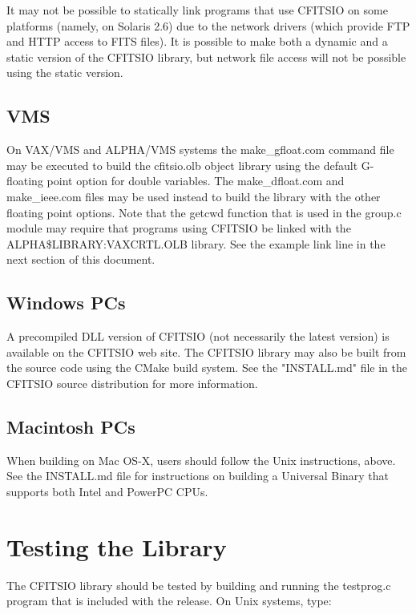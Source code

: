 \documentclass[11pt]{book}
\begin{document}
It may not be possible to statically link programs that use CFITSIO on
some platforms (namely, on Solaris 2.6) due to the network drivers
(which provide FTP and HTTP access to FITS files).  It is possible to
make both a dynamic and a static version of the CFITSIO library, but
network file access will not be possible using the static version.


\subsection{VMS}

On VAX/VMS and ALPHA/VMS systems the make\_gfloat.com command file may
be executed to build the cfitsio.olb object library using the default
G-floating point option for double variables.  The make\_dfloat.com and
make\_ieee.com files may be used instead to build the library with the
other floating point options. Note that the getcwd function that is
used in the group.c module may require that programs using CFITSIO be
linked with the ALPHA\$LIBRARY:VAXCRTL.OLB library.  See the example
link line in the next section of this document.


\subsection{Windows PCs}

A precompiled DLL version of CFITSIO (not necessarily the latest version)
is available on the CFITSIO web site.
The CFITSIO library may also be built from the source code using the
CMake build system.  See the "INSTALL.md" file in the CFITSIO source distribution
for more information.


\subsection{Macintosh PCs}

When building on Mac OS-X, users should follow the Unix instructions,
above.  See the INSTALL.md file for instructions on building a Universal
Binary that supports both Intel and PowerPC CPUs.


\section{Testing the Library}

The CFITSIO library should be tested by building and running
the testprog.c program that is included with the release.
On Unix systems, type:
\end{document}
